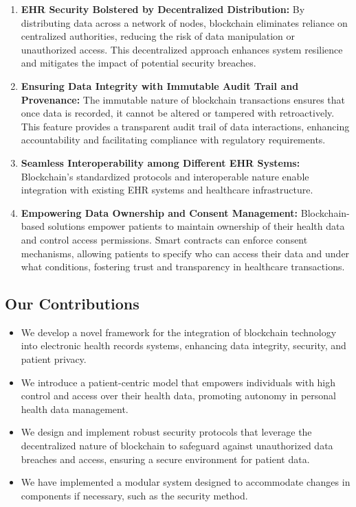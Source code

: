 \documentclass[12pt]{report}
\begin{document}
\begin{enumerate}
    \item \textbf{EHR Security Bolstered by Decentralized Distribution:} By distributing data across a network of nodes, blockchain eliminates reliance on centralized authorities, reducing the risk of data manipulation or unauthorized access. This decentralized approach enhances system resilience and mitigates the impact of potential security breaches.
    
    \item \textbf{Ensuring Data Integrity with Immutable Audit Trail and Provenance:} The immutable nature of blockchain transactions ensures that once data is recorded, it cannot be altered or tampered with retroactively. This feature provides a transparent audit trail of data interactions, enhancing accountability and facilitating compliance with regulatory requirements.
    
    \item \textbf{Seamless Interoperability among Different EHR Systems:} Blockchain's standardized protocols and interoperable nature enable integration with existing EHR systems and healthcare infrastructure.
    
    \item \textbf{Empowering Data Ownership and Consent Management:} Blockchain-based solutions empower patients to maintain ownership of their health data and control access permissions. Smart contracts can enforce consent mechanisms, allowing patients to specify who can access their data and under what conditions, fostering trust and transparency in healthcare transactions.
\end{enumerate}

\subsection{Our Contributions}
\begin{itemize}
    \item We develop a novel framework for the integration of blockchain technology into electronic health records systems, enhancing data integrity, security, and patient privacy.
    \item We introduce a patient-centric model that empowers individuals with high control and access over their health data, promoting autonomy in personal health data management.
    \item We design and implement robust security protocols that leverage the decentralized nature of blockchain to safeguard against unauthorized data breaches and access, ensuring a secure environment for patient data.
    \item We have implemented a modular system designed to accommodate changes in components if necessary, such as the security method.
\end{itemize}
\end{document}
